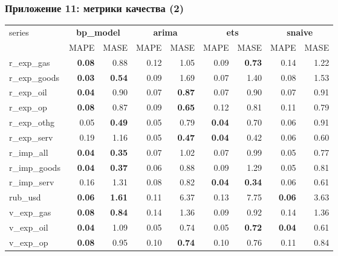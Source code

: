 \documentclass[9pt]{beamer}
\begin{document}
\begin{frame}
	\frametitle{Приложение 11: метрики качества (2)}	
\begin{center}
		\footnotesize
		\begin{tabular}{l|rr|rr|rr|rr}
			\toprule
			\multirow{2}{*}{series}&\multicolumn{2}{c|}{\textbf{bp\_model}}&\multicolumn{2}{c|}{\textbf{arima}}&\multicolumn{2}{c|}{\textbf{ets}}&\multicolumn{2}{c}{\textbf{snaive}}\\
			
			&MAPE & MASE & MAPE & MASE & MAPE & MASE & MAPE & MASE \\ 
			\midrule
	r\_exp\_gas & \textbf{0.08} & 0.88 & 0.12 & 1.05 & 0.09 & \textbf{0.73} & 0.14 & 1.22 \\ 
	r\_exp\_goods & \textbf{0.03} & \textbf{0.54} & 0.09 & 1.69 & 0.07 & 1.40 & 0.08 & 1.53 \\ 
	r\_exp\_oil &\textbf{0.04} & 0.90 & 0.07 & \textbf{0.87} & 0.07 & 0.90 & 0.07 & 0.91 \\ 
	r\_exp\_op & \textbf{0.08} & 0.87 & 0.09 & \textbf{0.65} & 0.12 & 0.81 & 0.11 & 0.79 \\ 
	r\_exp\_othg & 0.05 & \textbf{0.49} & 0.05 & 0.79 & \textbf{0.04} & 0.70 & 0.06 & 0.91 \\ 
	r\_exp\_serv & 0.19 & 1.16 & 0.05 & \textbf{0.47} & \textbf{0.04} & 0.42 & 0.06 & 0.60 \\ 
	r\_imp\_all & \textbf{0.04} & \textbf{0.35} & 0.07 & 1.02 & 0.07 & 0.99 & 0.05 & 0.77 \\ 
	r\_imp\_goods & \textbf{0.04} & \textbf{0.37} & 0.06 & 0.88 & 0.09 & 1.29 & 0.05 & 0.81 \\ 
	r\_imp\_serv & 0.16 & 1.31 & 0.08 & 0.82 & \textbf{0.04} & \textbf{0.34} & 0.06 & 0.61 \\ 
	rub\_usd & \textbf{0.06} & \textbf{1.61} & 0.11 & 6.37 & 0.13 & 7.75 & \textbf{0.06} & 3.63 \\ 
	v\_exp\_gas & \textbf{0.08} & \textbf{0.84} & 0.14 & 1.36 & 0.09 & 0.92 & 0.14 & 1.36 \\ 
	v\_exp\_oil & \textbf{0.04} & 1.09 & 0.05 & 0.74 & 0.05 & \textbf{0.72} & \textbf{0.04} & 0.61 \\ 
	v\_exp\_op & \textbf{0.08} & 0.95 & 0.10 & \textbf{0.74} & 0.10 & 0.76 & 0.11 & 0.84 \\ 
	\bottomrule
	\end{tabular}
	\captionsetup{justification=centering,margin=2cm}
	\label{tab:5}
	\end{center}
\end{frame}
\end{document}
